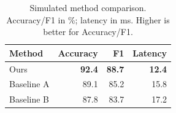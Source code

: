 \documentclass{article}
\begin{document}
\begin{table}[ht]
\centering
\caption{Simulated method comparison. Accuracy/F1 in \%;
latency in ms. Higher is better for Accuracy/F1.}
\label{tab:main}
\begin{tabular}{lrrr}
\toprule
Method & Accuracy & F1 & Latency \\
\midrule
Ours       & \textbf{92.4} & \textbf{88.7} & \textbf{12.4} \\
Baseline A & 89.1 & 85.2 & 15.8 \\
Baseline B & 87.8 & 83.7 & 17.2 \\
\bottomrule
\end{tabular}
\end{table}
\end{document}
